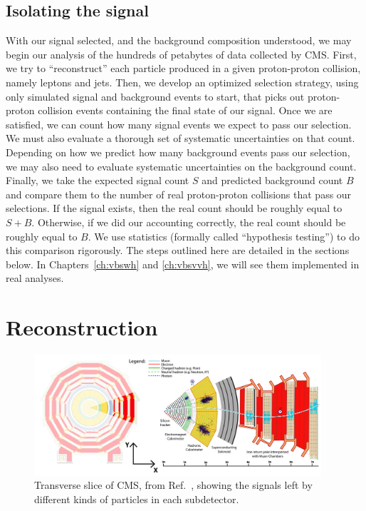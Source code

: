 \subsection{Isolating the signal}
With our signal selected, and the background composition understood, we may begin our analysis of the hundreds of petabytes of data collected by CMS. 
First, we try to ``reconstruct'' each particle produced in a given proton-proton collision, namely leptons and jets. 
Then, we develop an optimized selection strategy, using only simulated signal and background events to start, that picks out proton-proton collision events containing the final state of our signal. 
Once we are satisfied, we can count how many signal events we expect to pass our selection. 
We must also evaluate a thorough set of systematic uncertainties on that count. 
Depending on how we predict how many background events pass our selection, we may also need to evaluate systematic uncertainties on the background count. 
Finally, we take the expected signal count $S$ and predicted background count $B$ and compare them to the number of real proton-proton collisions that pass our selections. 
If the signal exists, then the real count should be roughly equal to $S+B$.
Otherwise, if we did our accounting correctly, the real count should be roughly equal to $B$. 
We use statistics (formally called ``hypothesis testing'') to do this comparison rigorously. 
The steps outlined here are detailed in the sections below. 
In Chapters~\ref{ch:vbswh} and \ref{ch:vbsvvh}, we will see them implemented in real analyses. 

\section{Reconstruction}

\begin{figure}[htb]
    \centering
    \includegraphics[width=0.95\textwidth]{fig/cms/particle_id_slice.pdf}
    \caption{
        Transverse slice of CMS, from Ref.~\cite{Davis:2205172}, showing the signals left by different kinds of particles in each subdetector.
    }
    \label{fig:cms_particle_id}
\end{figure}

